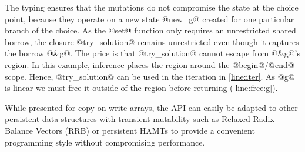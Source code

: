 The typing ensures that the mutations do not compromise the state at
the choice point, because they operate on a new state @new_g@ created for one
particular branch of the choice.
As the @set@ function only requires an unrestricted shared borrow,
the closure @try_solution@ remains unrestricted even though
it captures the borrow @&g@.
The price is that @try_solution@ cannot escape from
@&g@'s region. In this example, inference places the region
around the @begin@/@end@ scope.
Hence, @try_solution@ can be used in
the iteration in \cref{line:iter}.
As @g@ is linear we must free it outside of the region
before returning (\cref{line:free:g}).

While presented for copy-on-write arrays, the API
can easily be adapted to other persistent data structures with
transient mutability such as Relaxed-Radix Balance Vectors (RRB) \cite{DBLP:journals/pacmpl/Puente17}
or persistent HAMTs \cite{bagwell2001ideal,clojurehamt} to provide  a
convenient programming style without compromising performance.




